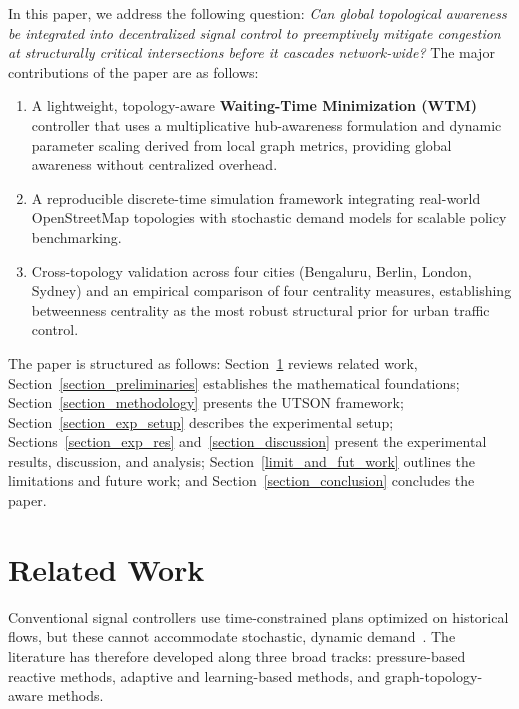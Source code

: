 \documentclass[letterpaper, conference]{IEEEtran}
\begin{document}
In this paper, we address the following question: \emph{Can global topological awareness be integrated into decentralized signal control to preemptively mitigate congestion at structurally critical intersections before it cascades network-wide?} The major contributions of the paper are as follows:
\begin{enumerate}[label=(\roman*),leftmargin=*]
\item A lightweight, topology-aware \textbf{Waiting-Time Minimization (WTM)} controller that uses a multiplicative hub-awareness formulation and dynamic parameter scaling derived from local graph metrics, providing global awareness without centralized overhead.
\item A reproducible discrete-time simulation framework integrating real-world OpenStreetMap topologies with stochastic demand models for scalable policy benchmarking.
\item Cross-topology validation across four cities (Bengaluru, Berlin, London, Sydney) and an empirical comparison of four centrality measures, establishing betweenness centrality as the most robust structural prior for urban traffic control.
\end{enumerate}
The paper is structured as follows: Section~\ref{section_related} reviews related work, Section~\ref{section_preliminaries} establishes the mathematical foundations; Section~\ref{section_methodology} presents the UTSON framework; Section~\ref{section_exp_setup} describes the experimental setup; Sections~\ref{section_exp_res} and~\ref{section_discussion} present the experimental results, discussion, and analysis; Section~\ref{limit_and_fut_work} outlines the limitations and future work; and Section~\ref{section_conclusion} concludes the paper.


\section{Related Work}
\label{section_related}
Conventional signal controllers use time-constrained plans optimized on historical flows, but these cannot accommodate stochastic, dynamic demand~\cite{daganzo1994queue}. The literature has therefore developed along three broad tracks: pressure-based reactive methods, adaptive and learning-based methods, and graph-topology-aware methods.
\end{document}
